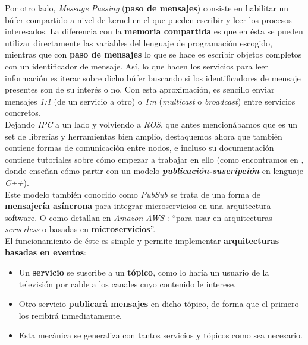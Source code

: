 Por otro lado, \textit{Message Passing} (\textbf{paso de mensajes}) consiste en habilitar un búfer compartido a nivel de kernel en el que pueden escribir y leer los procesos interesados. La diferencia con la \textbf{memoria compartida} es que en ésta se pueden utilizar directamente las variables del lenguaje de programación escogido, mientras que con \textbf{paso de mensajes} lo que se hace es escribir objetos completos con un identificador de mensaje. Así, lo que hacen los servicios para leer información es iterar sobre dicho búfer buscando si los identificadores de mensaje presentes son de su interés o no. Con esta aproximación, es sencillo enviar mensajes \textit{1:1} (de un servicio a otro) o \textit{1:n} (\textit{multicast} o \textit{broadcast}) entre servicios concretos.\\

Dejando \textit{IPC} a un lado y volviendo a \textit{ROS}, que antes mencionábamos que es un set de librerías y herramientas bien amplio, destaquemos ahora que también contiene formas de comunicación entre nodos, e incluso su documentación contiene tutoriales sobre cómo empezar a trabajar en ello (como encontramos en \cite{ros-tutorial}, donde enseñan cómo partir con un modelo \textbf{\textit{publicación-suscripción}} en lenguaje \textit{C++}).\\

Este modelo también conocido como \textit{PubSub} se trata de una forma de \textbf{mensajería asíncrona} para integrar microservicios en una arquitectura software. O como detallan en \textit{Amazon AWS} \cite{whats-pubsub}: ``para usar en arquitecturas \textit{serverless} o basadas en \textbf{microservicios}''.\\

El funcionamiento de éste es simple y permite implementar \textbf{arquitecturas basadas en eventos}:

\begin{itemize}
	\item Un \textbf{servicio} se suscribe a un \textbf{tópico}, como lo haría un usuario de la televisión por cable a los canales cuyo contenido le interese.
	\item Otro servicio \textbf{publicará mensajes} en dicho tópico, de forma que el primero los recibirá inmediatamente.
	\item Esta mecánica se generaliza con tantos servicios y tópicos como sea necesario.
\end{itemize}

